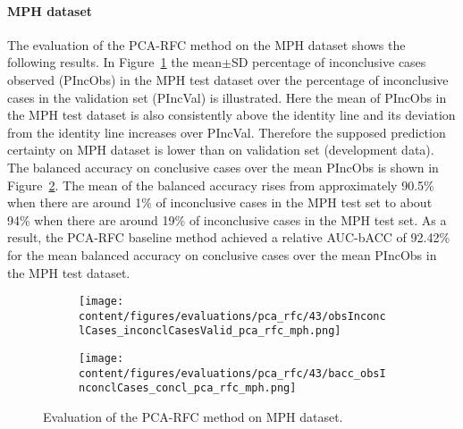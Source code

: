 
\paragraph{MPH dataset}

The evaluation of the PCA-RFC method on the MPH dataset shows the following results.
In Figure~\ref{fig:obsInconclCases_inconclCasesValid_pca_rfc_mph} 
the mean$\pm$SD percentage of inconclusive cases observed (PIncObs) in the MPH test dataset 
over the percentage of inconclusive cases in the validation set (PIncVal) is illustrated.
Here the mean of PIncObs in the MPH test dataset
is also consistently above the identity line and its deviation from the identity line increases over PIncVal.
Therefore the supposed prediction certainty on MPH dataset is lower than on validation set (development data).
The balanced accuracy on conclusive cases over the mean PIncObs is shown 
in Figure~\ref{fig:bacc_obsInconclCases_concl_pca_rfc_mph}.
The mean of the balanced accuracy rises from approximately 90.5\% 
when there are around 1\% of inconclusive cases in the MPH test set to about 94\% 
when there are around 19\% of inconclusive cases in the MPH test set.
As a result, the PCA-RFC baseline method achieved a relative AUC-bACC of 92.42\% for the mean balanced accuracy on conclusive cases 
over the mean PIncObs in the MPH test dataset.


\begin{figure}[ht]
  \begin{subfigure}{0.49\textwidth}
    \centering
    \texttt{[image: content/figures/evaluations/pca\_rfc/43/obsInconclCases\_inconclCasesValid\_pca\_rfc\_mph.png]}
    \label{fig:obsInconclCases_inconclCasesValid_pca_rfc_mph}
  \end{subfigure}
  \hfill
  \begin{subfigure}{0.49\textwidth}
    \centering
    \texttt{[image: content/figures/evaluations/pca\_rfc/43/bacc\_obsInconclCases\_concl\_pca\_rfc\_mph.png]}
    \label{fig:bacc_obsInconclCases_concl_pca_rfc_mph}
  \end{subfigure}
  \caption{Evaluation of the PCA-RFC method on MPH dataset.}
  \label{fig:perf_results_rfc_mph}
\end{figure}


